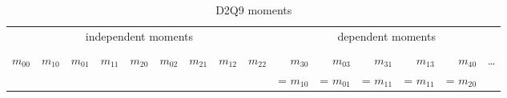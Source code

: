 \setlength{\tabcolsep}{3pt}
\begin{table} [ht!]
  \centering
  \begin{tabular}{r rr rrr rr r rrrrr r}
    \toprule
    \multicolumn{9}{c}{independent moments} & \multicolumn{6}{c}{dependent moments}   \\
    \cmidrule(lr){1-9}\cmidrule(lr){10-15} \\
    $m_{00}$
    & $m_{10}$
    & $m_{01}$
    & $m_{11}$
    & $m_{20}$
    & $m_{02}$
    & $m_{21}$
    & $m_{12}$
    & $m_{22}$
    & $m_{30}$
    & $m_{03}$
    & $m_{31}$
    & $m_{13}$
    & $m_{40}$
    & \ldots \\
    &&&&&&&&
    &= $m_{10}$
    & = $m_{01}$
    & = $m_{11}$
    & = $m_{11}$
    & = $m_{20}$ & \\
    \bottomrule
  \end{tabular}
  \caption{D2Q9 moments}\label{table:D2Q9 moments}
\end{table}
